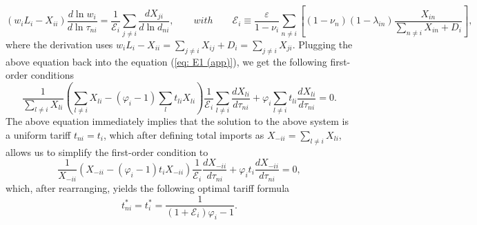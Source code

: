 \documentclass[12pt]{article}
\begin{document}
\[
\left(w_{i}L_{i}-X_{ii}\right)\frac{d\ln w_{i}}{d\ln\tau_{ni}}=\frac{1}{\mathscr{E}_{i}}\sum_{j\neq i}\frac{d X_{ji}}{d \ln d_{ni}},\qquad with\qquad\mathscr{E}_{i}\equiv\frac{\varepsilon}{1-\nu_{i}}\sum_{n\neq i}\left[(1-\nu_{n})\left(1-\lambda_{in}\right)\frac{X_{in}}{\sum_{n\neq i}X_{in}+D_{i}}\right],
\]
where the derivation uses $w_{i}L_{i}-X_{ii}=\sum_{j\neq i}X_{ij}+D_{i}=\sum_{j\neq i}X_{ji}$.  Plugging the above equation back into the equation (\ref{eq: E1 (app)}), we get the following first-order conditions
\[
\frac{1}{\sum_{l\neq i}X_{li}}\left(\sum_{l\neq i}X_{li}-(\varphi_{i}-1)\sum_{l}t_{li}X_{li}\right)\frac{1}{\mathscr{E}_{i}}\sum_{l\neq i}\frac{dX_{li}}{d\tau_{ni}}+\varphi_{i}\sum_{l \neq i}t_{li}\frac{dX_{li}}{d\tau_{ni}} =0. 
\]
The above equation immediately implies that the solution to the above system is a uniform tariff $t_{ni}=t_i$, which after defining total imports as $X_{-ii}=\sum_{l\neq i}X_{li}$, allows us to simplify the first-order condition to
\[
\frac{1}{X_{-ii}}\left(X_{-ii}-(\varphi_{i}-1)t_{i}X_{-ii}\right)\frac{1}{\mathscr{E}_{i}}\frac{dX_{-ii}}{d\tau_{ni}}+\varphi_{i}t_{i}\frac{dX_{-ii}}{d\tau_{ni}}=0,
\]
which, after rearranging, yields the following optimal tariff formula
\[
t_{ni}^{*}=t^*_i=\frac{1}{\left(1+\mathscr{E}_{i}\right)\varphi_{i}-1}.
\]
\end{document}
